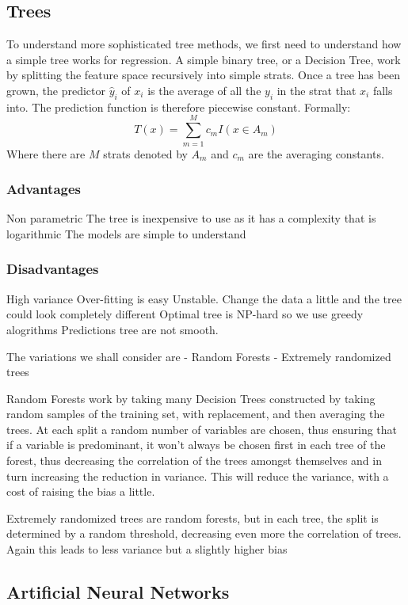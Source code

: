 \subsection{Trees}
To understand more sophisticated tree methods, we first need to understand how a simple tree works for regression.
A simple binary tree, or a Decision Tree, work by splitting the feature space recursively into simple strats. Once a tree has been grown, the predictor $\hat{y}_i$ of $x_i$ is the average of all the $y_i$ in the strat that $x_i$ falls into. The prediction function is therefore piecewise constant.
Formally:
$$
T(x) = \sum_{m=1}^M c_m I(x \in A_m)
$$
Where there are $M$ strats denoted by $A_m$ and $c_m$ are the averaging constants.

\subsubsection{Advantages}
Non parametric
The tree is inexpensive to use as it has a complexity that is logarithmic
The models are simple to understand
\subsubsection{Disadvantages}
High variance
Over-fitting is easy
Unstable. Change the data a little and the tree could look completely different
Optimal tree is NP-hard so we use greedy alogrithms
Predictions tree are not smooth.


The variations we shall consider are
- Random Forests
- Extremely randomized trees

Random Forests work by taking many Decision Trees constructed by taking random samples of the training set, with replacement, and then averaging the trees. At each split a random number of variables are chosen, thus ensuring that if a variable is predominant, it won't always be chosen first in each tree of the forest, thus decreasing the correlation of the trees amongst themselves and in turn increasing the reduction in variance.
This will reduce the variance, with a cost of raising the bias a little.

Extremely randomized trees are random forests, but in each tree, the split is determined by a random threshold, decreasing even more the correlation of trees. 
Again this leads to less variance but a slightly higher bias

\subsection{Artificial Neural Networks}